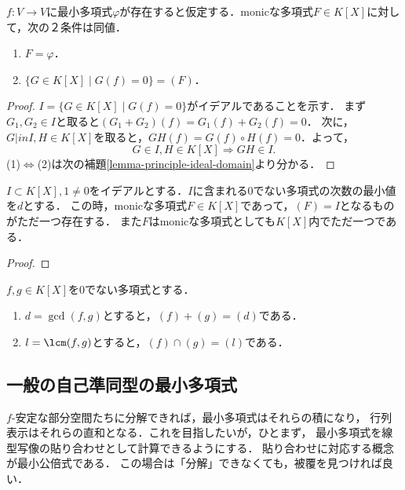 \documentclass[uplatex, dvipdfmx]{jsreport}
\begin{document}
\begin{proposition}\label{prop-characterization-of-minimal-polynomial}
    $f:V\to V$に最小多項式$\varphi$が存在すると仮定する．monicな多項式$F\in K[X]$に対して，次の２条件は同値．
    \begin{enumerate}
        \item $F=\varphi$．
        \item $\{G\in K[X]\mid G(f)=0\}=(F)$．
    \end{enumerate}
\end{proposition}
\begin{proof}
    $I=\{G\in K[X]\mid G(f)=0\}$がイデアルであることを示す．
    まず$G_1,G_2\in I$と取ると$(G_1+G_2)(f)=G_1(f)+G_2(f)=0$．
    次に，$G|in I, H\in K[X]$を取ると，$GH(f)=G(f)\circ H(f)=0$．よって，
    \[ G\in I,H\in K[X]\Rightarrow GH\in I. \]
    (1)$\Leftrightarrow$(2)は次の補題\ref{lemma-principle-ideal-domain}より分かる．
\end{proof}

\begin{lemma}[$K$-多項式環は単項イデアル整域である]\label{lemma-principle-ideal-domain}
    $I\subset K[X], 1\ne 0$をイデアルとする．$I$に含まれる$0$でない多項式の次数の最小値を$d$とする．
    この時，monicな多項式$F\in K[X]$であって，$(F)=I$となるものがただ一つ存在する．
    また$F$はmonicな多項式としても$K[X]$内でただ一つである．
\end{lemma}
\begin{proof}
    
\end{proof}

\begin{corollary}
    $f,g\in K[X]$を$0$でない多項式とする．
    \begin{enumerate}
        \item $d=\gcd(f,g)$とすると，$(f)+(g)=(d)$である．
        \item $l=\lcm(f,g)$とすると，$(f)\cap(g)=(l)$である．
    \end{enumerate}
\end{corollary}

\subsection{一般の自己準同型の最小多項式}

\begin{tcolorbox}[colframe=ForestGreen, colback=ForestGreen!10!white, breakable]
    $f$-安定な部分空間たちに分解できれば，最小多項式はそれらの積になり，
    行列表示はそれらの直和となる．これを目指したいが，ひとまず，
    最小多項式を線型写像の貼り合わせとして計算できるようにする．
    貼り合わせに対応する概念が最小公倍式である．
    この場合は「分解」できなくても，被覆を見つければ良い．
\end{tcolorbox}
\end{document}
